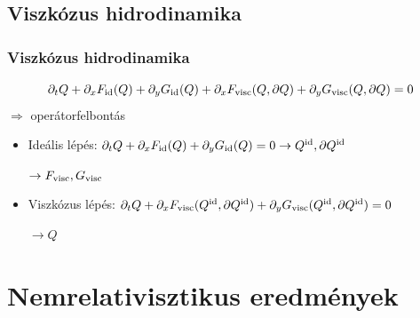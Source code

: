 \documentclass{beamer}
\begin{document}
\subsection{Viszkózus hidrodinamika}
\begin{frame}[noframenumbering]
\frametitle{Viszkózus hidrodinamika}
\begin{equation*}
\partial_t Q + \partial_x F_{\rm id}(Q)+\partial_y G_{\rm id}(Q)+\partial_x F_{\rm visc}(Q,\partial Q)+\partial_y G_{\rm visc}(Q,\partial Q) = 0
\end{equation*}
\vspace{10pt}
$\Longrightarrow$ operátorfelbontás
\vspace{10pt}
\begin{itemize}
\setlength{\itemsep}{20pt}
\item<1-> Ideális lépés: $\partial_t Q + \partial_x F_{\rm id}(Q)+\partial_y G_{\rm id}(Q)=0\rightarrow Q^{\rm id},\partial Q^{\rm id}$

$\rightarrow F_{\rm visc}, G_{\rm visc}$ 

\item<1-> Viszkózus lépés: $\partial_t Q + \partial_x F_{\rm visc}(Q^{\rm id},\partial Q^{\rm id})+\partial_y G_{\rm visc}(Q^{\rm id},\partial Q^{\rm id}) = 0$ 

$\rightarrow Q$ 

\end{itemize}



\end{frame}

\section{Nemrelativisztikus eredmények}
\end{document}
